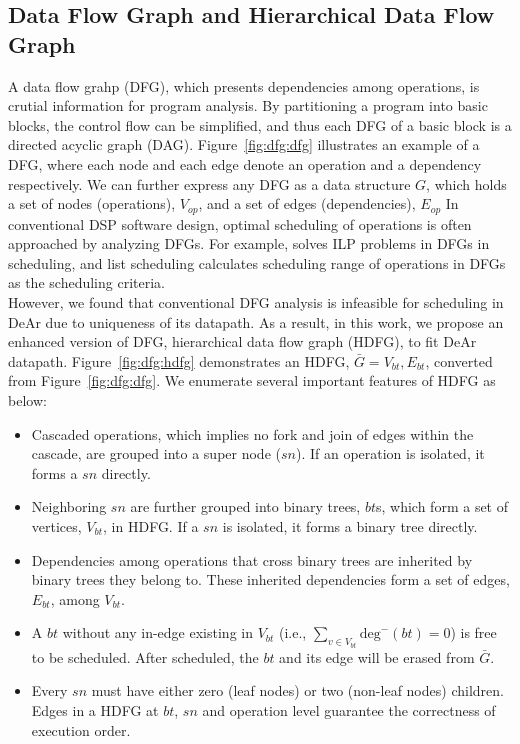 \subsection{Data Flow Graph and Hierarchical Data Flow Graph}
\label{sec:hdfg}
A data flow grahp (DFG), which presents dependencies among operations, is crutial information for program analysis.
By partitioning a program into basic blocks, the control flow can be simplified, and thus each DFG of a basic block is a directed acyclic graph (DAG).
Figure~\ref{fig:dfg:dfg} illustrates an example of a DFG, where each node and each edge denote an operation and a dependency respectively.
We can further express any DFG as a data structure $G$, which holds a set of nodes (operations), $V_{op}$, and a set of edges (dependencies), $E_{op}$
In conventional DSP software design, optimal scheduling of operations is often approached by analyzing DFGs.
For example, \cite{dsplite} solves ILP problems \cite{ilp} in DFGs in scheduling, 
and list scheduling \cite{list} calculates scheduling range of operations in DFGs as the scheduling criteria. 
\\\indent
However, we found that conventional DFG analysis is infeasible for scheduling in DeAr due to uniqueness of its datapath.
As a result, in this work, we propose an enhanced version of DFG, hierarchical data flow graph (HDFG), to fit DeAr datapath.
Figure~\ref{fig:dfg:hdfg} demonstrates an HDFG, $\bar{G} = {V_{bt}, E_{bt}}$, converted from Figure~\ref{fig:dfg:dfg}.
We enumerate several important features of HDFG as below: 
\begin{itemize}
    \item Cascaded operations, which implies no fork and join of edges within the cascade, are grouped into a super node ($sn$). 
        If an operation is isolated, it forms a $sn$ directly.
    \item Neighboring $sn$ are further grouped into binary trees, $bt$s, which form a set of vertices, $V_{bt}$, in HDFG.
        If a $sn$ is isolated, it forms a binary tree directly.
    \item Dependencies among operations that cross binary trees are inherited by binary trees they belong to.
        These inherited dependencies form a set of edges, $E_{bt}$, among $V_{bt}$.
    \item A $bt$ without any in-edge existing in $V_{bt}$ (i.e., $\sum_{v \in V_{bt}}\textrm{deg}^-(bt) = 0$) is free to be scheduled. 
        After scheduled, the $bt$ and its edge will be erased from $\bar{G}$.
    \item Every $sn$ must have either zero (leaf nodes) or two (non-leaf nodes) children.
        Edges in a HDFG at $bt$, $sn$ and operation level guarantee the correctness of execution order.
\end{itemize}
